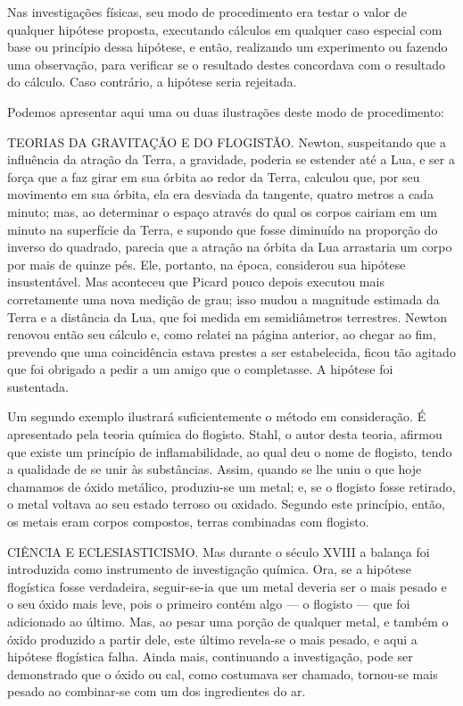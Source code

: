 \documentclass[11pt,a5paper,twoside,openany]{book}
\begin{document}
Nas investigações físicas, seu modo de procedimento era testar o valor de qualquer hipótese proposta, executando cálculos em qualquer caso especial com base ou princípio dessa hipótese, e então, realizando um experimento ou fazendo uma observação, para verificar se o resultado destes concordava com o resultado do cálculo. Caso contrário, a hipótese seria rejeitada.

Podemos apresentar aqui uma ou duas ilustrações deste modo de procedimento:

TEORIAS DA GRAVITAÇÃO E DO FLOGISTÃO. Newton, suspeitando que a influência da atração da Terra, a gravidade, poderia se estender até a Lua, e ser a força que a faz girar em sua órbita ao redor da Terra, calculou que, por seu movimento em sua órbita, ela era desviada da tangente, quatro metros a cada minuto; mas, ao determinar o espaço através do qual os corpos cairiam em um minuto na superfície da Terra, e supondo que fosse diminuído na proporção do inverso do quadrado, parecia que a atração na órbita da Lua arrastaria um corpo por mais de quinze pés. Ele, portanto, na época, considerou sua hipótese insustentável. Mas aconteceu que Picard pouco depois executou mais corretamente uma nova medição de grau; isso mudou a magnitude estimada da Terra e a distância da Lua, que foi medida em semidiâmetros terrestres. Newton renovou então seu cálculo e, como relatei na página anterior, ao chegar ao fim, prevendo que uma coincidência estava prestes a ser estabelecida, ficou tão agitado que foi obrigado a pedir a um amigo que o completasse. A hipótese foi sustentada.

Um segundo exemplo ilustrará suficientemente o método em consideração. É apresentado pela teoria química do flogisto. Stahl, o autor desta teoria, afirmou que existe um princípio de inflamabilidade, ao qual deu o nome de flogisto, tendo a qualidade de se unir às substâncias. Assim, quando se lhe uniu o que hoje chamamos de óxido metálico, produziu-se um metal; e, se o flogisto fosse retirado, o metal voltava ao seu estado terroso ou oxidado. Segundo este princípio, então, os metais eram corpos compostos, terras combinadas com flogisto.

CIÊNCIA E ECLESIASTICISMO. Mas durante o século XVIII a balança foi introduzida como instrumento de investigação química. Ora, se a hipótese flogística fosse verdadeira, seguir-se-ia que um metal deveria ser o mais pesado e o seu óxido mais leve, pois o primeiro contém algo — o flogisto — que foi adicionado ao último. Mas, ao pesar uma porção de qualquer metal, e também o óxido produzido a partir dele, este último revela-se o mais pesado, e aqui a hipótese flogística falha. Ainda mais, continuando a investigação, pode ser demonstrado que o óxido ou cal, como costumava ser chamado, tornou-se mais pesado ao combinar-se com um dos ingredientes do ar.
\end{document}
